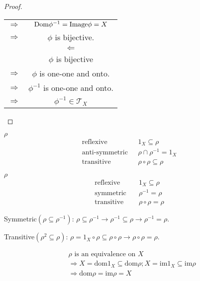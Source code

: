 \begin{Prop}
\begin{proof}
\begin{center}
\begin{tabular}{c c}
                $\Rightarrow$ & $\mathrm{Dom}\phi^{-1} = \mathrm{Image}\phi = X$    \\
                $\Rightarrow$ & $\phi$ is bijective.    \\
                & $\Leftarrow$  \\
                & $\phi$ is bijective   \\
                $\Rightarrow$ & $\phi$ is one-one and onto. \\
                $\Rightarrow$ & $\phi^{-1}$ is one-one and onto.    \\
                $\Rightarrow$ & $\phi^{-1} \in \mathcal{T}_X$
            \end{tabular}
        \end{center}
    \end{proof}
\end{Prop}

\begin{Rmk}$\rho $
    \begin{align*}
        \text{reflexive} &\text{    }  1_X \subseteq \rho \\
        \text{anti-symmetric} &\text{    } \rho\cap \rho^{-1} =1_X \\
        \text{transitive}  &\text{    } \rho \circ \rho \subseteq \rho 
    \end{align*}
\end{Rmk}

\begin{Rmk}$\rho $
    \begin{align*}
        \text{reflexive } & \text{    } 1_X \subseteq \rho \\
        \text{symmetric } & \text{    } \rho^{-1}=\rho \\
        \text{transitive } & \text{    } \rho \circ \rho = \rho 
    \end{align*}

    Symmetric$(\rho \subseteq \rho^{-1})$: $\rho \subseteq \rho^{-1}\rightarrow \rho^{-1}\subseteq \rho \rightarrow \rho^{-1}=\rho $. 
    
    Transitive$(\rho^2 \subseteq \rho)$: $\rho =1_X\circ \rho \subseteq \rho \circ \rho \rightarrow \rho \circ \rho =\rho$.
\end{Rmk}

\begin{Rmk}
    \begin{align*}
        &\rho \text{ is an equivalence on }X   \\
        &\Rightarrow  X = \mathrm{dom}1_X \subseteq \mathrm{dom} \rho ; X=\mathrm{im}1_X\subseteq \mathrm{im}\rho   \\
        &\Rightarrow \mathrm{dom}\rho =\mathrm{im}\rho =X
    \end{align*}
\end{Rmk}


